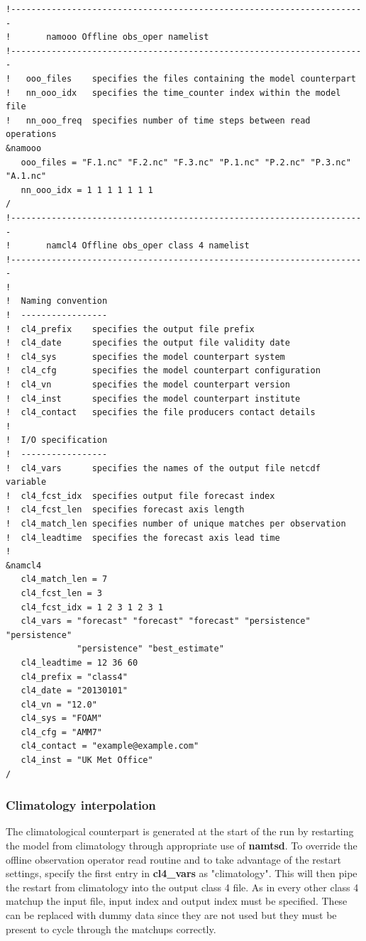 \begin{alltt}
\tiny
\begin{verbatim}
!----------------------------------------------------------------------
!       namooo Offline obs_oper namelist
!----------------------------------------------------------------------
!   ooo_files    specifies the files containing the model counterpart
!   nn_ooo_idx   specifies the time_counter index within the model file
!   nn_ooo_freq  specifies number of time steps between read operations
&namooo
   ooo_files = "F.1.nc" "F.2.nc" "F.3.nc" "P.1.nc" "P.2.nc" "P.3.nc" "A.1.nc"
   nn_ooo_idx = 1 1 1 1 1 1 1
/
!----------------------------------------------------------------------
!       namcl4 Offline obs_oper class 4 namelist
!----------------------------------------------------------------------
!
!  Naming convention
!  -----------------
!  cl4_prefix    specifies the output file prefix
!  cl4_date      specifies the output file validity date
!  cl4_sys       specifies the model counterpart system
!  cl4_cfg       specifies the model counterpart configuration
!  cl4_vn        specifies the model counterpart version
!  cl4_inst      specifies the model counterpart institute
!  cl4_contact   specifies the file producers contact details
!
!  I/O specification
!  -----------------
!  cl4_vars      specifies the names of the output file netcdf variable
!  cl4_fcst_idx  specifies output file forecast index
!  cl4_fcst_len  specifies forecast axis length
!  cl4_match_len specifies number of unique matches per observation
!  cl4_leadtime  specifies the forecast axis lead time 
!
&namcl4
   cl4_match_len = 7
   cl4_fcst_len = 3
   cl4_fcst_idx = 1 2 3 1 2 3 1
   cl4_vars = "forecast" "forecast" "forecast" "persistence" "persistence"
              "persistence" "best_estimate"
   cl4_leadtime = 12 36 60
   cl4_prefix = "class4"
   cl4_date = "20130101"
   cl4_vn = "12.0"
   cl4_sys = "FOAM"
   cl4_cfg = "AMM7"
   cl4_contact = "example@example.com"
   cl4_inst = "UK Met Office"
/
\end{verbatim}
\end{alltt}

\subsubsection{Climatology interpolation}

The climatological counterpart is generated at the start of the run by restarting 
the model from climatology through appropriate use of \textbf{namtsd}. To override
the offline observation operator read routine and to take advantage of the restart
settings, specify the first entry in \textbf{cl4\_vars} as "climatology". This will then
pipe the restart from climatology into the output class 4 file. As in every other
class 4 matchup the input file, input index and output index must be specified.
These can be replaced with dummy data since they are not used but they must be
present to cycle through the matchups correctly. 

